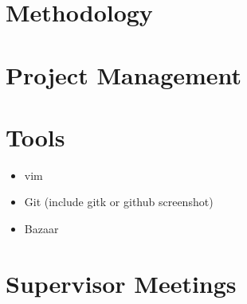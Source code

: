 \section{Methodology}

\section{Project Management}

\section{Tools}
\begin{itemize}
\item vim
\item Git (include gitk or github screenshot)
\item Bazaar
\end{itemize}

\section{Supervisor Meetings}


